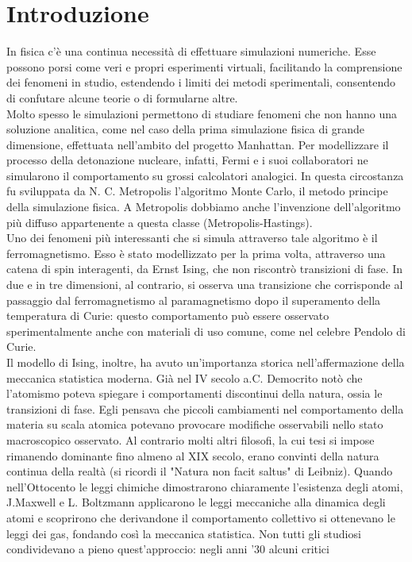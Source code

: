 \documentclass[a4paper]{article}
\begin{document}
\section{Introduzione}
In fisica c'è una continua necessità di effettuare simulazioni numeriche. Esse possono porsi come veri e propri esperimenti virtuali, facilitando la comprensione dei fenomeni in studio, estendendo i limiti dei metodi sperimentali, consentendo di confutare alcune teorie o di formularne altre. \\
Molto spesso le simulazioni permettono di studiare fenomeni che non hanno una soluzione analitica, come nel caso della prima simulazione fisica di grande dimensione, effettuata nell'ambito del progetto Manhattan. Per modellizzare il processo della detonazione nucleare, infatti, Fermi e i suoi collaboratori ne simularono il comportamento su grossi calcolatori analogici. In questa circostanza fu sviluppata da N. C. Metropolis l'algoritmo Monte Carlo, il metodo principe della simulazione fisica. A Metropolis dobbiamo anche l'invenzione dell'algoritmo più diffuso appartenente a questa classe (Metropolis-Hastings).\\
Uno dei fenomeni più interessanti che si simula attraverso tale algoritmo è il ferromagnetismo. Esso è stato modellizzato per la prima volta, attraverso una catena di spin interagenti, da Ernst Ising, che non riscontrò transizioni di fase. In due e in tre dimensioni, al contrario, si osserva una transizione che corrisponde al passaggio dal ferromagnetismo al paramagnetismo dopo il superamento della temperatura di Curie: questo comportamento può essere osservato sperimentalmente anche con materiali di uso comune, come nel celebre Pendolo di Curie. \\
Il modello di Ising, inoltre, ha avuto un'importanza storica nell'affermazione della meccanica statistica moderna.
Già nel IV secolo a.C. Democrito notò che l'atomismo poteva spiegare i comportamenti discontinui della natura, ossia le transizioni di fase. Egli pensava che piccoli cambiamenti nel comportamento della materia su scala atomica potevano provocare modifiche osservabili nello stato macroscopico osservato. 
Al contrario molti altri filosofi, la cui tesi si impose rimanendo dominante fino almeno al XIX secolo, erano convinti della natura continua della realtà (si ricordi il "Natura non facit saltus" di Leibniz).
Quando nell'Ottocento le leggi chimiche dimostrarono chiaramente l'esistenza degli atomi, J.Maxwell e L. Boltzmann applicarono le leggi meccaniche alla dinamica degli atomi e scoprirono che derivandone il comportamento collettivo si ottenevano le leggi dei gas, fondando così la meccanica statistica. Non tutti gli studiosi condividevano a pieno quest'approccio: negli anni '30 alcuni critici
\end{document}
